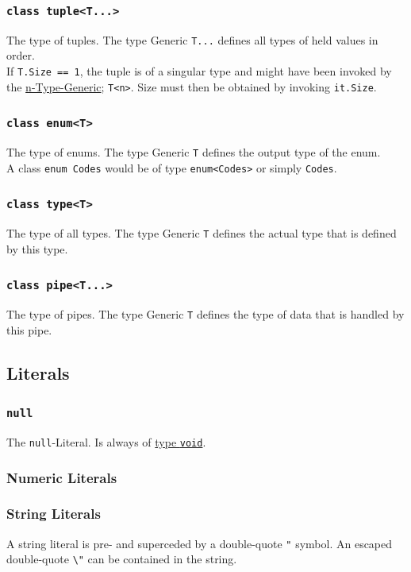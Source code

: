 \documentclass{docs}
\begin{document}
    \subsubsection{\texttt{class tuple<T...>}}
    The type of tuples. The type Generic \texttt{T...} defines all types of held values in order.
    \\
    If \texttt{T.Size == 1}, the tuple is of a singular type and might have been invoked by the \hyperref[typeGenN]{n-Type-Generic}; \texttt{T<n>}.
    Size must then be obtained by invoking \texttt{it.Size}.
    
    \subsubsection{\texttt{class enum<T>}}
    The type of enums. The type Generic \texttt{T} defines the output type of the enum.
    \\
    A class \texttt{enum Codes} would be of type \texttt{enum<Codes>} or simply \texttt{Codes}.
    
    \subsubsection{\texttt{class type<T>}}
    The type of all types. The type Generic \texttt{T} defines the actual type that is defined by this type.
    
    \subsubsection{\texttt{class pipe<T...>}}
    The type of pipes. The type Generic \texttt{T} defines the type of data that is handled by this pipe.
    
    \subsection{Literals}
    
    \subsubsection{\texttt{null}}
    The \texttt{null}-Literal. Is always of \hyperref[typeVoid]{type \texttt{void}}.
    
    \subsubsection{Numeric Literals}
    
    \subsubsection{String Literals}
    A string literal is pre- and superceded by a double-quote \texttt{"} symbol.
    An escaped double-quote \texttt{\textbackslash"} can be contained in the string.
    
\end{document}
